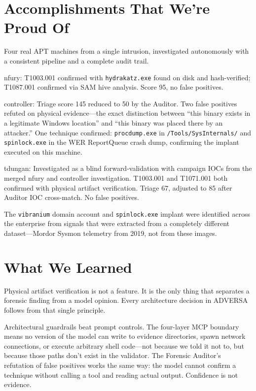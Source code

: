 \documentclass[10pt, letterpaper]{article}
\begin{document}
\section{Accomplishments That We're Proud Of}

Four real APT machines from a single intrusion, investigated
autonomously with a consistent pipeline and a complete audit trail.

nfury: T1003.001 confirmed with \texttt{hydrakatz.exe} found on disk and
hash-verified; T1087.001 confirmed via SAM hive analysis. Score 95, no
false positives.

controller: Triage score 145 reduced to 50 by the Auditor. Two false
positives refuted on physical evidence---the exact distinction between
``this binary exists in a legitimate Windows location'' and ``this binary
was placed there by an attacker.'' One technique confirmed:
\texttt{procdump.exe} in \texttt{/Tools/SysInternals/} and
\texttt{spinlock.exe} in the WER ReportQueue crash dump, confirming the
implant executed on this machine.

tdungan: Investigated as a blind forward-validation with campaign IOCs
from the merged nfury and controller investigation. T1003.001 and
T1071.001 both confirmed with physical artifact verification. Triage 67,
adjusted to 85 after Auditor IOC cross-match. No false positives.

The \texttt{vibranium} domain account and \texttt{spinlock.exe} implant
were identified across the enterprise from signals that were extracted
from a completely different dataset---Mordor Sysmon telemetry from 2019,
not from these images.

\section{What We Learned}

Physical artifact verification is not a feature. It is the only thing
that separates a forensic finding from a model opinion. Every
architecture decision in ADVERSA follows from that single principle.

Architectural guardrails beat prompt controls. The four-layer MCP
boundary means no version of the model can write to evidence directories,
spawn network connections, or execute arbitrary shell code---not because
we told it not to, but because those paths don't exist in the validator.
The Forensic Auditor's refutation of false positives works the same way:
the model cannot confirm a technique without calling a tool and reading
actual output. Confidence is not evidence.
\end{document}
